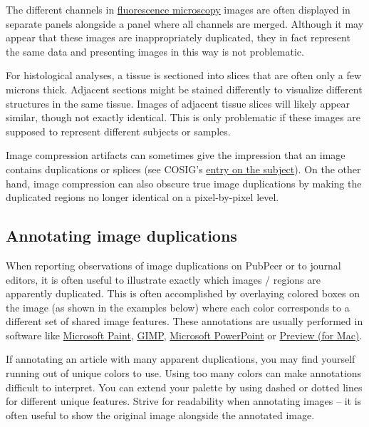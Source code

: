 \documentclass[letterpaper, 12pt]{article}
\begin{document}
The different channels in \href{https://en.wikipedia.org/wiki/Fluorescence_microscope}{fluorescence microscopy} images are often displayed in separate panels alongside a panel where all channels are merged. Although it may appear that these images are inappropriately duplicated, they in fact represent the same data and presenting images in this way is not problematic.

For histological analyses, a tissue is sectioned into slices that are often only a few microns thick. Adjacent sections might be stained differently to visualize different structures in the same tissue. Images of adjacent tissue slices will likely appear similar, though not exactly identical. This is only problematic if these images are supposed to represent different subjects or samples.

Image compression artifacts can sometimes give the impression that an image contains duplications or splices (see COSIG's \href{https://osf.io/e5vzr}{entry on the subject}). On the other hand, image compression can also obscure true image duplications by making the duplicated regions no longer identical on a pixel-by-pixel level.

\subsection*{Annotating image duplications}

When reporting observations of image duplications on PubPeer or to journal editors, it is often useful to illustrate exactly which images / regions are apparently duplicated. This is often accomplished by overlaying colored boxes on the image (as shown in the examples below) where each color corresponds to a different set of shared image features. These annotations are usually performed in software like \href{https://www.microsoft.com/en-us/windows/paint}{Microsoft Paint}, \href{https://www.gimp.org/}{GIMP}, \href{https://www.microsoft.com/en-us/microsoft-365/powerpoint}{Microsoft PowerPoint} or \href{https://support.apple.com/guide/preview/welcome/mac}{Preview (for Mac)}. 

If annotating an article with many apparent duplications, you may find yourself running out of unique colors to use. Using too many colors can make annotations difficult to interpret. You can extend your palette by using dashed or dotted lines for different unique features. Strive for readability when annotating images -- it is often useful to show the original image alongside the annotated image.
\end{document}
